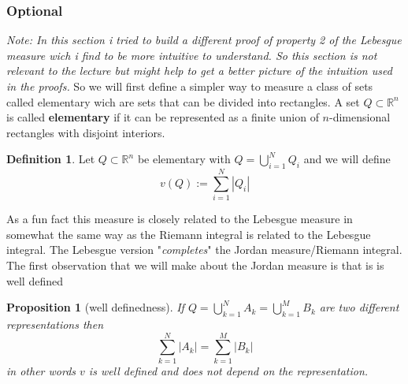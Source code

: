 \documentclass[11pt,a4paper]{article}
\newcommand{\bR}{\mathbb{R}}
\theoremstyle{plain}
\newtheorem{proposition}[theorem]{Proposition}
\theoremstyle{definition}
\newtheorem{definition}[theorem]{Definition}
\begin{document}
\subsubsection*{Optional}
\textit{Note: In this section i tried to build a different proof of property 2 of the Lebesgue measure wich i find to be more intuitive to understand.
So this section is not relevant to the lecture but might help to get a better picture of the intuition used in the proofs.}
\newline 
\newline
\noindent So we will first define a simpler way to measure a class of sets called elementary wich are sets that can be divided into 
rectangles.
A set $Q \subset \mathbb{R}^n$ is called \textbf{elementary} if it can be represented as a finite union of $n$-dimensional rectangles with disjoint interiors.
\begin{definition}
     Let $Q \subset \bR^n$ be elementary with $Q = \bigcup_{i=1}^N Q_i$ and we will define
    \[
        v(Q) := \sum_{i=1}^N |Q_i|
    \]
\end{definition}
\noindent As a fun fact this measure is closely related to the Lebesgue measure in somewhat the same way as the Riemann integral is related to the
Lebesgue integral. The Lebesgue version "\textit{completes}" the Jordan measure/Riemann integral.
The first observation that we will make about the Jordan measure is that is is well defined
\begin{proposition}[well definedness]
    If $Q = \bigcup_{k=1}^N A_k = \bigcup_{k=1}^M B_k$ are two different representations then 
    \[
        \sum_{k=1}^N |A_k| = \sum_{k=1}^M |B_k|
    \]
    in other words $v$ is well defined and does not depend on the representation.
\end{proposition}
\end{document}

